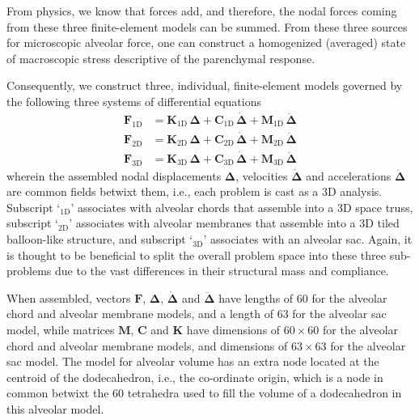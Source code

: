 From physics, we know that forces add, and therefore, the nodal forces coming from these three finite-element models can be summed. From these three sources for micro\-scopic alveolar force, one can construct a homo\-genized (averaged) state of macro\-scopic stress descriptive of the parenchymal response.

Consequently, we construct three, individual, finite-element models governed by the following three systems of differential equations
\begin{subequations}
    \label{EofMotion}
	\begin{align}
    \boldsymbol{F}_{\mathrm{1D}} & =
    \mathbf{K}_{\mathrm{1D}} \, \boldsymbol{\Delta} +
    \mathbf{C}_{\mathrm{1D}} \, \dot{\boldsymbol{\Delta}} +
    \mathbf{M}_{\mathrm{1D}} \, \ddot{\boldsymbol{\Delta}} \\
    \boldsymbol{F}_{\mathrm{2D}} & =
    \mathbf{K}_{\mathrm{2D}} \, \boldsymbol{\Delta} +
    \mathbf{C}_{\mathrm{2D}} \, \dot{\boldsymbol{\Delta}} + 
    \mathbf{M}_{\mathrm{2D}} \, \ddot{\boldsymbol{\Delta}} \\
    \boldsymbol{F}_{\mathrm{3D}} & = 
    \mathbf{K}_{\mathrm{3D}} \, \boldsymbol{\Delta} +
    \mathbf{C}_{\mathrm{3D}} \, \dot{\boldsymbol{\Delta}} + 
    \mathbf{M}_{\mathrm{3D}} \, \ddot{\boldsymbol{\Delta}}
	\end{align}
\end{subequations}
wherein the assembled nodal displacements $\boldsymbol{\Delta}$, velocities $\dot{\boldsymbol{\Delta}}$ and accelerations $\ddot{\boldsymbol{\Delta}}$ are common fields betwixt them, i.e., each problem is cast as a 3D analysis.  Subscript `$\mbox{}_{\mathrm{1D}}$' associates with alveolar chords that assemble into a 3D space truss, subscript `$\mbox{}_{\mathrm{2D}}$' associates with alveolar membranes that assemble into a 3D tiled balloon-like structure, and subscript `$\mbox{}_{\mathrm{3D}}$' associates with an alveolar sac.  Again, it is thought to be beneficial to split the overall problem space into these three sub-problems due to the vast differences in their structural mass and compliance.

When assembled, vectors $\boldsymbol{F}$, $\boldsymbol{\Delta}$, $\dot{\boldsymbol{\Delta}}$ and $\ddot{\boldsymbol{\Delta}}$ have lengths of 60 for the alveolar chord and alveolar membrane models, and a length of 63 for the alveolar sac model, while matrices $\mathbf{M}$, $\mathbf{C}$ and $\mathbf{K}$ have dimensions of $60 \! \times \! 60$ for the alveolar chord and alveolar membrane models, and dimensions of $63 \! \times \! 63$ for the alveolar sac model.  The model for alveolar volume has an extra node located at the centroid of the dodecahedron, i.e., the co-ordinate origin, which is a node in common betwixt the 60 tetrahedra used to fill the volume of a dodecahedron in this alveolar model. 

